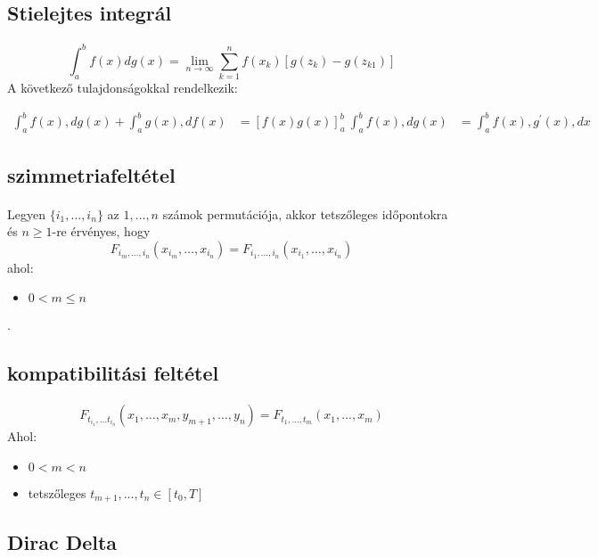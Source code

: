 \documentclass[11pt,a4paper]{article}
\begin{document}
			\subsection{Stielejtes integrál}
				\paragraph{}
					$$\int_a^b f(x) dg(x) = \lim_{n \to \infty} \sum_{k=1}^n f(x_k)[g(z_k) - g(z_{k1})]$$
					A következő tulajdonságokkal rendelkezik:

					\begin{align*}
						\int_a^b f(x) , dg(x) + \int_a^b g(x) , df(x) &= [f(x) g(x)]_a^b \
						\int_a^b f(x) , dg(x) &= \int_a^b f(x) , g^\prime (x) , dx
					\end{align*}
			\subsection{szimmetriafeltétel}
				\paragraph{}
					Legyen $\{i_1, \dots, i_n\}$ az $1, \dots, n$ számok permutációja, akkor tetszőleges időpontokra és $n \ge 1$-re érvényes, hogy
					$$F_{i_m, \dots, i_n}(x_{i_m}, \dots, x_{i_n}) = F_{i_1, \dots, i_n}(x_{i_1}, \dots, x_{i_n})$$
					ahol:
					\begin{itemize}
						\item $0 < m \le n$ 
					\end{itemize}.
			\subsection{kompatibilitási feltétel}
				\paragraph{}
					$$F_{t_{i_1},\dots t_{i_n}}(x_1, \dots, x_m, y_{m+1}, \dots,y_n) = F_{t_1, \dots,t_m}(x_1, \dots, x_m)$$
					Ahol:
					\begin{itemize}
						\item $0< m < n$
						\item tetszőleges $t_{m+1}, \dots , t_n \in [t_0,T]$
					\end{itemize}
			\subsection{Dirac Delta}
\end{document}
